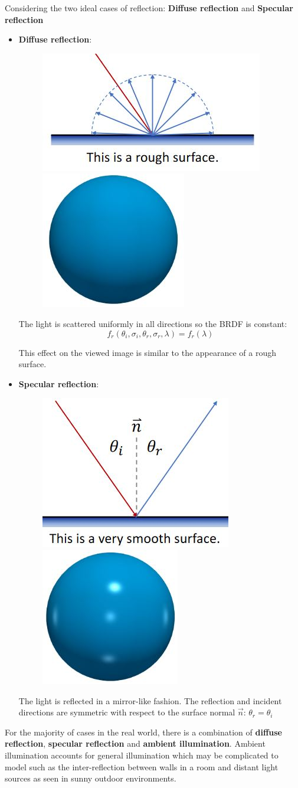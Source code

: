 \documentclass{report}
\begin{document}
Considering the two ideal cases of reflection: \textbf{Diffuse reflection} and
\textbf{Specular reflection}
\begin{itemize}
    \item \textbf{Diffuse reflection}: 
    \begin{figure}[h!]
        \centering
        \includegraphics[width=.2\linewidth]{Diffuse reflection angle.JPG}
        \qquad
        \includegraphics[width=.1\linewidth]{Diffuse reflection view.JPG}
    \end{figure}

    The light is scattered uniformly in all directions so the BRDF is constant:
    $$
        f_r\left(\theta_i, \sigma_i, \theta_r, \sigma_r, \lambda\right) = f_r(\lambda)
    $$

    This effect on the viewed image is similar to the appearance of a rough
    surface.
    
    \item \textbf{Specular reflection}: 
    \begin{figure}[h!]
        \centering
        \includegraphics[width=.15\linewidth]{Specular reflection angle.JPG}
        \qquad
        \includegraphics[width=.1\linewidth]{Specular reflection view.JPG}
    \end{figure}

    The light is reflected in a mirror-like fashion. The reflection and incident directions are symmetric with respect to the
    surface normal $\vec{n}$: $\theta_r = \theta_i$
\end{itemize}

For the majority of cases in the real world, there is a combination of
\textbf{diffuse reflection}, \textbf{specular reflection} and \textbf{ambient
illumination}. Ambient illumination accounts for general illumination which may be
complicated to model such as the inter-reflection between walls in a room and
distant light sources as seen in sunny outdoor environments.
\end{document}
